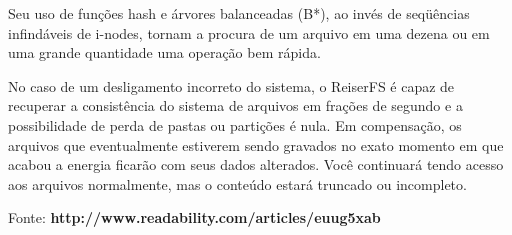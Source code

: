 Seu uso de funções hash e árvores balanceadas (B*), ao invés de seqüências infindáveis de i-nodes, tornam a procura de um arquivo em uma dezena ou em uma grande quantidade uma operação bem rápida.

No caso de um desligamento incorreto do sistema, o ReiserFS é capaz de recuperar a consistência do sistema de arquivos em frações de segundo e a possibilidade de perda de pastas ou partições é nula. Em compensação, os arquivos que eventualmente estiverem sendo gravados no exato momento em que acabou a energia ficarão com seus dados alterados. Você continuará tendo acesso aos arquivos normalmente, mas o conteúdo estará truncado ou incompleto.

Fonte: \textbf{http://www.readability.com/articles/euug5xab}

